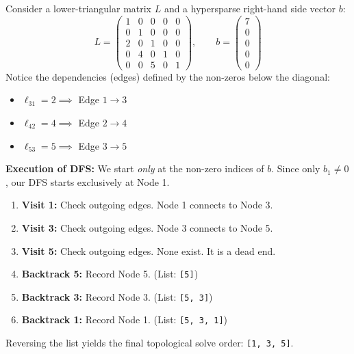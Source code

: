 \documentclass[11pt, a4paper]{article}
\begin{document}
\begin{example}\label{ex:dfs_reach}
Consider a lower-triangular matrix $L$ and a hypersparse right-hand side vector $b$:
\[
L = \begin{pmatrix} 
1 & 0 & 0 & 0 & 0 \\ 
0 & 1 & 0 & 0 & 0 \\ 
2 & 0 & 1 & 0 & 0 \\ 
0 & 4 & 0 & 1 & 0 \\ 
0 & 0 & 5 & 0 & 1 
\end{pmatrix},
\qquad
b = \begin{pmatrix} 7 \\ 0 \\ 0 \\ 0 \\ 0 \end{pmatrix}
\]
Notice the dependencies (edges) defined by the non-zeros below the diagonal:
\begin{itemize}[itemsep=1pt]
    \item $\ell_{31} = 2 \implies$ Edge $1 \to 3$
    \item $\ell_{42} = 4 \implies$ Edge $2 \to 4$
    \item $\ell_{53} = 5 \implies$ Edge $3 \to 5$
\end{itemize}

\textbf{Execution of DFS:}
We start \emph{only} at the non-zero indices of $b$. Since only $b_1 \neq 0$, our DFS starts exclusively at Node 1.
\begin{enumerate}[label=\textbf{\arabic*.}, leftmargin=*, itemsep=2pt]
    \item \textbf{Visit 1:} Check outgoing edges. Node 1 connects to Node 3.
    \item \textbf{Visit 3:} Check outgoing edges. Node 3 connects to Node 5.
    \item \textbf{Visit 5:} Check outgoing edges. None exist. It is a dead end.
    \item \textbf{Backtrack 5:} Record Node 5. \quad (List: \texttt{[5]})
    \item \textbf{Backtrack 3:} Record Node 3. \quad (List: \texttt{[5, 3]})
    \item \textbf{Backtrack 1:} Record Node 1. \quad (List: \texttt{[5, 3, 1]})
\end{enumerate}

Reversing the list yields the final topological solve order: \texttt{[1, 3, 5]}.
\end{example}
\end{document}
